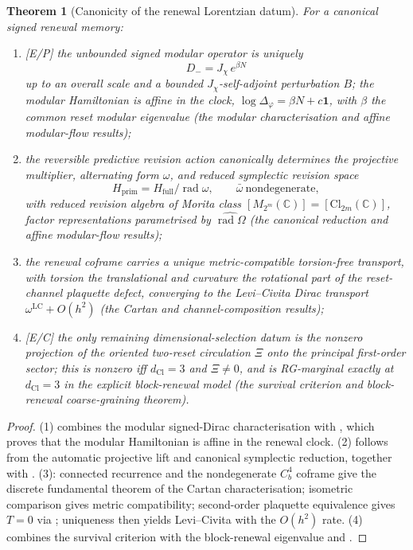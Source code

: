 \documentclass[11pt]{article}
\newtheorem{theorem}{Theorem}[section]
\theoremstyle{definition}
\theoremstyle{remark}
\newcommand{\C}{\mathbb{C}}
\newcommand{\Hf}{H_{\mathrm{full}}}
\newcommand{\Cl}{\mathrm{Cl}}
\newcommand{\rad}{\operatorname{rad}}
\newcommand{\dCl}{d_{\mathrm{Cl}}}
\newcommand{\one}{\mathbf{1}}
\newcommand{\Hprim}{H_{\mathrm{prim}}}
\newcommand{\Jchi}{J_\chi}
\begin{document}
\begin{theorem}[Canonicity of the renewal Lorentzian datum]
\label{thm:canonicity}
For a canonical signed renewal memory:
\begin{enumerate}[label=\textup{(\arabic*)},leftmargin=2.6em]
\item \textup{[E/P]} the unbounded signed modular operator is uniquely
      \[
        D_-=\Jchi\,e^{\beta N}
      \]
      up to an overall scale and a bounded $\Jchi$-self-adjoint perturbation $B$;
      the modular Hamiltonian is affine in the clock, $\log\Delta_\varphi=\beta N
      +c\one$, with $\beta$ the common reset modular eigenvalue
      \textup{(}the modular characterisation and affine modular-flow results\textup{)};
\item the reversible predictive revision action canonically determines the
      projective multiplier, alternating form $\omega$, and reduced symplectic revision space
      \[
        \Hprim=\Hf/\rad\omega,\qquad \bar\omega\ \text{nondegenerate},
      \]
      with reduced revision algebra of Morita class $[M_{2^m}(\C)]=
      [\Cl_{2m}(\C)]$, factor representations parametrised by
      $\widehat{\rad\Omega}$ \textup{(}the canonical reduction and affine modular-flow results\textup{)};
\item the renewal coframe carries a unique metric-compatible
      torsion-free transport, with torsion the translational and curvature the
      rotational part of the reset-channel plaquette defect, converging to the
      Levi--Civita Dirac transport $\omega^{\mathrm{LC}}+O(h^2)$
      \textup{(}the Cartan and channel-composition results\textup{)};
\item \textup{[E/C]} the only remaining dimensional-selection datum is the
      nonzero projection of the oriented two-reset circulation $\Xi$ onto the
      principal first-order sector; this is nonzero iff $\dCl=3$ and $\Xi\neq0$,
      and is RG-marginal exactly at $\dCl=3$ in the explicit block-renewal model
      \textup{(}the survival criterion and block-renewal coarse-graining theorem\textup{)}.
\end{enumerate}
\end{theorem}

\begin{proof}
(1) combines the modular signed-Dirac characterisation with
, which proves that the modular Hamiltonian is affine in
the renewal clock.  (2) follows from the automatic projective lift and canonical symplectic
reduction, together with
.
(3): connected recurrence and the nondegenerate
$C^4_b$ coframe give the discrete fundamental theorem of the Cartan characterisation; isometric
comparison gives metric compatibility; second-order plaquette equivalence gives
$T=0$ via ; uniqueness then yields Levi--Civita with the
$O(h^2)$ rate.  (4) combines the survival criterion with the
block-renewal eigenvalue  and .
\end{proof}
\end{document}
